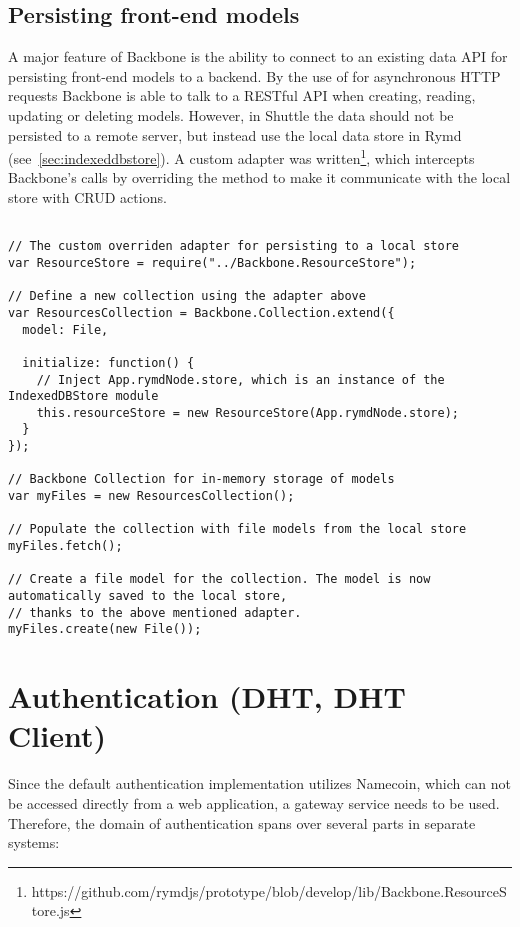 \subsection{Persisting front-end models}

A major feature of Backbone is the ability to connect to an existing data API for persisting front-end models to a backend. By the use of  for asynchronous HTTP requests Backbone is able to talk to a RESTful API when creating, reading, updating or deleting models. However, in Shuttle the data should not be persisted to a remote server, but instead use the local data store in Rymd (see~\ref{sec:indexeddbstore}). A custom adapter was written\footnote{https://github.com/rymdjs/prototype/blob/develop/lib/Backbone.ResourceStore.js}, which intercepts Backbone's calls by overriding the  method to make it communicate with the local store with CRUD actions.

\begin{Code}
\begin{lstlisting}[caption={Sample scenario of persisting models}, label={lst:backbonesync}]

// The custom overriden adapter for persisting to a local store
var ResourceStore = require("../Backbone.ResourceStore");

// Define a new collection using the adapter above
var ResourcesCollection = Backbone.Collection.extend({
  model: File,

  initialize: function() {
    // Inject App.rymdNode.store, which is an instance of the IndexedDBStore module
    this.resourceStore = new ResourceStore(App.rymdNode.store);
  }
});

// Backbone Collection for in-memory storage of models
var myFiles = new ResourcesCollection();

// Populate the collection with file models from the local store
myFiles.fetch();

// Create a file model for the collection. The model is now automatically saved to the local store,
// thanks to the above mentioned adapter.
myFiles.create(new File());
\end{lstlisting}
\end{Code}

\section{Authentication (DHT, DHT Client)}
\label{sec:authentication}
Since the default authentication implementation utilizes Namecoin, which can not be accessed directly from a web application, a gateway service needs to be used. Therefore, the domain of authentication spans over several parts in separate systems:

